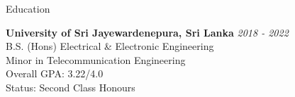 \documentclass[
	11pt, %
]{./assets/resume} %
\begin{document}
\begin{rSection}{Education}

	\textbf{University of Sri Jayewardenepura, Sri Lanka} \hfill \textit{2018 - 2022} \\ 
	B.S. (Hons) Electrical \& Electronic Engineering \\
	Minor in Telecommunication Engineering \smallskip \\
	Overall GPA: 3.22/4.0 \\
	Status: Second Class Honours
	
\end{rSection}

\end{document}
